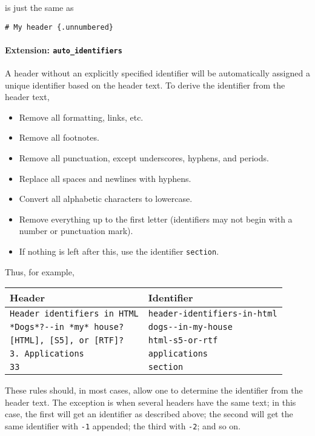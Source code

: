 \documentclass[]{article}
\providecommand{\tightlist}{%
  \setlength{\itemsep}{0pt}\setlength{\parskip}{0pt}}
\let\oldparagraph\paragraph
\renewcommand{\paragraph}[1]{\oldparagraph{#1}\mbox{}}
\begin{document}
is just the same as

\begin{verbatim}
# My header {.unnumbered}
\end{verbatim}

\paragraph{\texorpdfstring{Extension:
\texttt{auto\_identifiers}}{Extension: auto\_identifiers}}\label{extension-auto_identifiers}

A header without an explicitly specified identifier will be
automatically assigned a unique identifier based on the header text. To
derive the identifier from the header text,

\begin{itemize}
\tightlist
\item
  Remove all formatting, links, etc.
\item
  Remove all footnotes.
\item
  Remove all punctuation, except underscores, hyphens, and periods.
\item
  Replace all spaces and newlines with hyphens.
\item
  Convert all alphabetic characters to lowercase.
\item
  Remove everything up to the first letter (identifiers may not begin
  with a number or punctuation mark).
\item
  If nothing is left after this, use the identifier \texttt{section}.
\end{itemize}

Thus, for example,

\begin{longtable}[]{@{}ll@{}}
\toprule
Header & Identifier\tabularnewline
\midrule
\endhead
\texttt{Header\ identifiers\ in\ HTML} &
\texttt{header-identifiers-in-html}\tabularnewline
\texttt{*Dogs*?-\/-in\ *my*\ house?} &
\texttt{dogs-\/-in-my-house}\tabularnewline
\texttt{{[}HTML{]},\ {[}S5{]},\ or\ {[}RTF{]}?} &
\texttt{html-s5-or-rtf}\tabularnewline
\texttt{3.\ Applications} & \texttt{applications}\tabularnewline
\texttt{33} & \texttt{section}\tabularnewline
\bottomrule
\end{longtable}

These rules should, in most cases, allow one to determine the identifier
from the header text. The exception is when several headers have the
same text; in this case, the first will get an identifier as described
above; the second will get the same identifier with \texttt{-1}
appended; the third with \texttt{-2}; and so on.
\end{document}

